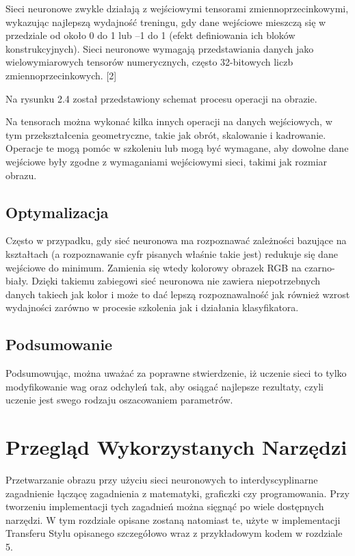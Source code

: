 \documentclass[brudnopis]{xmgr}
\begin{document}
Sieci neuronowe zwykle działają z wejściowymi tensorami zmiennoprzecinkowymi, wykazując najlepszą wydajność treningu, gdy dane wejściowe mieszczą się w przedziale od około 0 do 1 lub –1 do 1 (efekt definiowania ich bloków konstrukcyjnych). Sieci neuronowe wymagają przedstawiania danych jako wielowymiarowych tensorów numerycznych, często 32-bitowych liczb zmiennoprzecinkowych. [2]

Na rysunku 2.4 został przedstawiony schemat procesu operacji na obrazie.

Na tensorach można  wykonać kilka innych operacji na danych wejściowych, w tym przekształcenia geometryczne, takie jak obrót, skalowanie i kadrowanie. Operacje te mogą pomóc w szkoleniu lub mogą być wymagane, aby dowolne dane wejściowe były zgodne z wymaganiami wejściowymi sieci, takimi jak rozmiar obrazu.

 \section{Optymalizacja \label{s:dsssl}}
 
 Często w przypadku, gdy sieć neuronowa ma rozpoznawać zależności bazujące na kształtach (a rozpoznawanie cyfr pisanych właśnie takie jest) redukuje się dane wejściowe do minimum. Zamienia się wtedy kolorowy obrazek RGB na czarno-biały. Dzięki takiemu zabiegowi sieć neuronowa nie zawiera  niepotrzebnych danych takiech jak kolor i może to dać lepszą rozpoznawalność jak również wzrost wydajności zarówno w procesie szkolenia jak i działania klasyfikatora.  



 \section{Podsumowanie \label{s:dsssl}}
 
Podsumowując, można uważać za  poprawne stwierdzenie, iż uczenie sieci to tylko modyfikowanie wag oraz odchyleń tak, aby osiągać najlepsze rezultaty, czyli uczenie jest swego rodzaju oszacowaniem parametrów.   



\chapter{Przegląd Wykorzystanych Narzędzi}

Przetwarzanie obrazu przy użyciu sieci neuronowych to interdyscyplinarne zagadnienie łączącę zagadnienia z matematyki, graficzki czy programowania. Przy tworzeniu implementacji tych zagadnień można sięgnąć po wiele dostępnych narzędzi. W tym rozdziale opisane zostaną natomiast te, użyte w implementacji Transferu Stylu opisanego szczegółowo wraz z przykładowym kodem w rozdziale 5.
\end{document}
